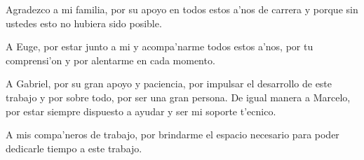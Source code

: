 
Agradezco a mi familia, por su apoyo en todos estos a'nos de carrera y porque sin ustedes esto no hubiera sido posible.

A Euge, por estar junto a mi y acompa'narme todos estos a'nos, por tu comprensi'on y por alentarme en cada momento.

A Gabriel, por su gran apoyo y paciencia, por impulsar el desarrollo de este trabajo y por sobre todo, por ser una gran persona.
De igual manera a Marcelo, por estar siempre dispuesto a ayudar y ser mi soporte t'ecnico.

A mis compa'neros de trabajo, por brindarme el espacio necesario para poder dedicarle tiempo a este trabajo.